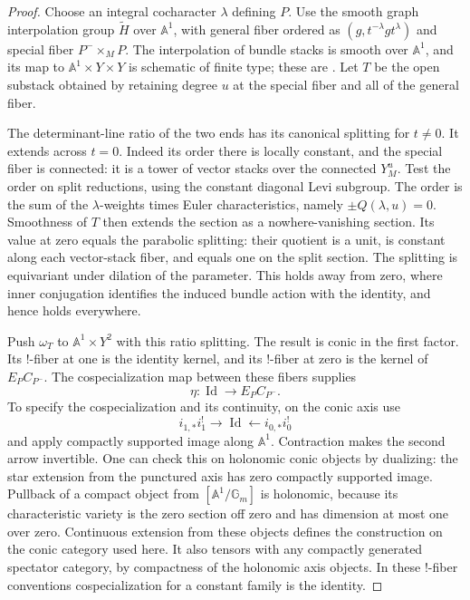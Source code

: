 \begin{proof}
Choose an integral cocharacter $\lambda$ defining $P$.  Use the smooth graph
interpolation group $\widetilde H$ over $\mathbb A^1$, with general fiber
ordered as $(g,t^{-\lambda}gt^\lambda)$ and special fiber
$P^-\times_M P$.  The interpolation of bundle stacks is smooth over
$\mathbb A^1$, and its map to $\mathbb A^1\times Y\times Y$ is schematic of
finite type; these are
\cite[Section~2.4 and Proposition~2.5.2]{DrinfeldGaitsgoryCT}.  Let $T$ be the
open substack obtained by retaining degree $u$ at the special fiber and all
of the general fiber.

The determinant-line ratio of the two ends has its canonical splitting for
$t\ne0$.  It extends across $t=0$.  Indeed its order there is locally
constant, and the special fiber is connected: it is a tower of vector
stacks over the connected $Y_M^u$.  Test the order on split reductions,
using the constant diagonal Levi subgroup.  The order is the sum of the
$\lambda$-weights times Euler characteristics, namely $\pm Q(\lambda,u)=0$.
Smoothness of $T$ then extends the section as a nowhere-vanishing section.
Its value at zero equals the parabolic splitting: their quotient is a
unit, is constant along each vector-stack fiber, and equals one on the
split section.  The splitting is equivariant under dilation of the
parameter.  This holds away from zero, where inner conjugation identifies
the induced bundle action with the identity, and hence holds everywhere.

Push $\omega_T$ to $\mathbb A^1\times Y^2$ with this ratio splitting.  The
result is conic in the first factor.  Its !-fiber at one is the identity
kernel, and its !-fiber at zero is the kernel of $E_PC_{P^-}$.  The
cospecialization map between these fibers supplies
\[
 \eta:\operatorname{Id}\longrightarrow E_PC_{P^-}.
\]
To specify the cospecialization and its continuity, on the conic axis use
\[
 i_{1,*}i_1^!\longrightarrow\operatorname{Id}
 \longleftarrow i_{0,*}i_0^!
\]
and apply compactly supported image along $\mathbb A^1$.  Contraction makes
the second arrow invertible.  One can check this on holonomic conic
objects by dualizing: the star extension from the punctured axis has zero
compactly supported image.  Pullback of a compact object from
$[\mathbb A^1/\mathbb G_m]$ is holonomic, because its characteristic variety
is the zero section off zero and has dimension at most one over zero.
Continuous extension from these objects defines the construction on the
conic category used here.  It also tensors with any compactly generated
spectator category, by compactness of the holonomic axis objects.  In these
!-fiber conventions cospecialization for a constant family is the identity.


\end{proof}
